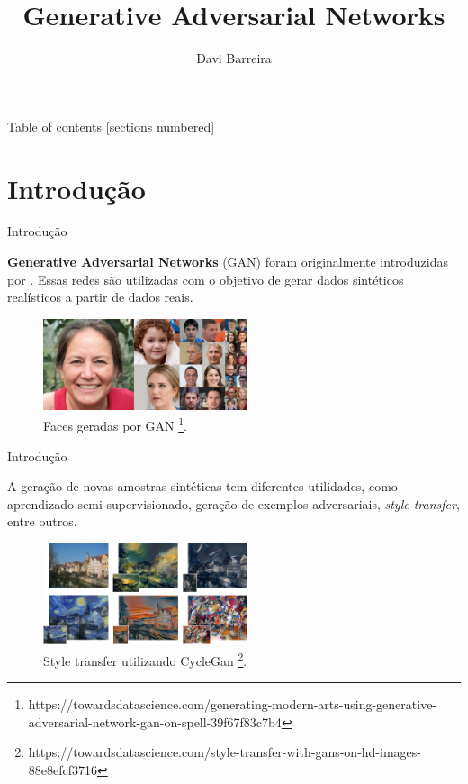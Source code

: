 \documentclass[10pt]{beamer}
\title{Generative Adversarial Networks}
\subtitle{}
\date{}
\author{Davi Barreira}
\institute{FGV - Escola de Matemática Aplicada}
\begin{document}
\maketitle

\begin{frame}{Table of contents}
  [sections numbered]
  \tableofcontents[hideallsubsections]
\end{frame}

\AtBeginSection{}
\section[Introdução]{Introdução}
\begin{frame}[fragile]{Introdução}

	\textbf{Generative Adversarial Networks} (GAN)
	foram originalmente introduzidas por \citet{goodfellow2014}.
	Essas redes são utilizadas com o objetivo de gerar
	dados sintéticos realísticos a partir de dados reais.

    \begin{figure}[H]
        \centering
        \includegraphics[width=6cm]{images/gans-faces.png}
        \caption{Faces geradas por GAN
        \footnote{https://towardsdatascience.com/generating-modern-arts-using-generative-adversarial-network-gan-on-spell-39f67f83c7b4}.}
    \end{figure}

\end{frame}

\begin{frame}[fragile]{Introdução}

	A geração de novas amostras sintéticas tem diferentes utilidades,
	como aprendizado semi-supervisionado, geração de exemplos
	adversariais, \textit{style transfer}, entre outros.

    \begin{figure}[H]
        \centering
        \includegraphics[width=6cm]{images/style-transfer.jpeg}
        \caption{Style transfer utilizando CycleGan
        \footnote{https://towardsdatascience.com/style-transfer-with-gans-on-hd-images-88e8efcf3716}.}
    \end{figure}


\end{frame}
\end{document}
